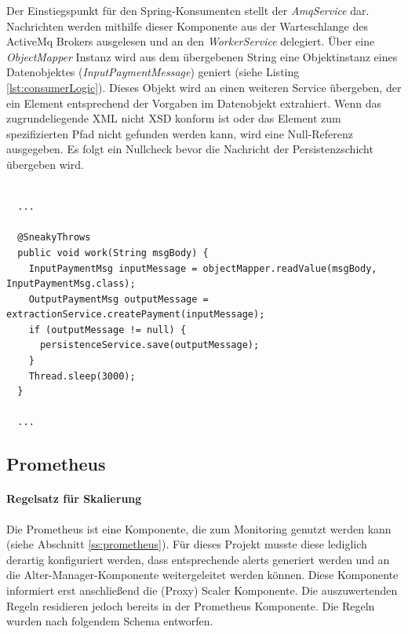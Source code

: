 Der Einstiegspunkt für den Spring-Konsumenten stellt der \emph{AmqService} dar. Nachrichten werden mithilfe dieser Komponente aus der Warteschlange des ActiveMq Brokers ausgelesen und an den \emph{WorkerService} delegiert. Über eine \emph{ObjectMapper} Instanz wird aus dem übergebenen String eine Objektinstanz eines Datenobjektes (\emph{InputPaymentMessage}) geniert (siehe Listing \ref{lst:consumerLogic}). Dieses Objekt wird an einen weiteren Service übergeben, der ein Element entsprechend der Vorgaben im Datenobjekt extrahiert. Wenn das zugrundeliegende XML nicht XSD konform ist oder das Element zum spezifizierten Pfad nicht gefunden werden kann, wird eine Null-Referenz ausgegeben. Es folgt ein Nullcheck bevor die Nachricht der Persistenzschicht übergeben wird.

\begin{minipage}{\linewidth}
\begin{lstlisting}[style=javaStyle,caption={WorkerService - Konsumer Logik},label=lst:consumerLogic]

  ...

  @SneakyThrows
  public void work(String msgBody) {
    InputPaymentMsg inputMessage = objectMapper.readValue(msgBody, InputPaymentMsg.class);
    OutputPaymentMsg outputMessage = extractionService.createPayment(inputMessage);
    if (outputMessage != null) {
      persistenceService.save(outputMessage);
    }
    Thread.sleep(3000);
  }

  ...

\end{lstlisting}
\end{minipage}


\subsection{Prometheus}

\paragraph{Regelsatz für Skalierung}
Die Prometheus ist eine Komponente, die zum Monitoring genutzt werden kann (siehe Abschnitt \ref{ss:prometheus}). Für dieses Projekt musste diese lediglich derartig konfiguriert werden, dass entsprechende alerts generiert werden und an die Alter-Manager-Komponente weitergeleitet werden können. Diese Komponente informiert erst anschließend die (Proxy) Scaler Komponente. Die auszuwertenden Regeln residieren jedoch bereits in der Prometheus Komponente. Die Regeln wurden nach folgendem Schema entworfen.

